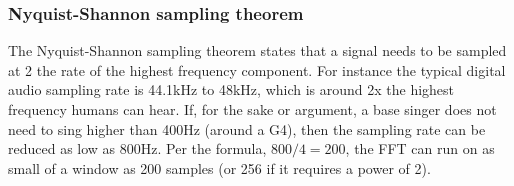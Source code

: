 \subsubsection{Nyquist-Shannon sampling theorem}
The Nyquist-Shannon sampling theorem states that a signal needs to be sampled at 2 the rate of the highest frequency component. For instance the typical digital audio sampling rate is 44.1kHz to 48kHz, which is around 2x the highest frequency humans can hear. If, for the sake or argument, a base singer does not need to sing higher than 400Hz (around a G4), then the sampling rate can be reduced as low as 800Hz. Per the formula, $800/4 = 200$, the FFT can run on as small of a window as 200 samples (or 256 if it requires a power of 2).